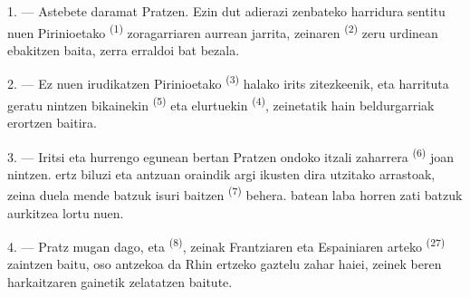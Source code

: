 %

\VUsaut{4.0mm}
\VUsaut{3.0mm}

\VUsaut{3.0mm}

\VUsaut{3.0mm}

1. --- Astebete daramat Pratzen. Ezin dut adierazi zenbateko harridura sentitu
nuen Pirinioetako  \textsuperscript{(1)} zoragarriaren aurrean
jarrita, zeinaren  \textsuperscript{(2)} zeru urdinean ebakitzen
baita, zerra erraldoi bat bezala.

2. --- Ez nuen irudikatzen Pirinioetako 
\textsuperscript{(3)} halako  irits zitezkeenik, eta harrituta
geratu nintzen  bikainekin \textsuperscript{(5)} eta
 elurtuekin \textsuperscript{(4)}, zeinetatik hain
 beldurgarriak erortzen baitira.

\VUsaut{3.0mm}
\VUsaut{3.0mm}

3. --- Iritsi eta hurrengo egunean bertan Pratzen ondoko 
itzali zaharrera \textsuperscript{(6)} joan nintzen.  ertz
biluzi eta antzuan oraindik argi ikusten dira  utzitako arrastoak,
zeina duela mende batzuk isuri baitzen 
\textsuperscript{(7)} behera.  batean laba horren zati batzuk
aurkitzea lortu nuen.

4. --- Pratz mugan dago, eta  \textsuperscript{(8)}, zeinak
Frantziaren eta Espainiaren arteko  \textsuperscript{(27)}
zaintzen baitu, oso antzekoa da Rhin ertzeko gaztelu zahar haiei, zeinek beren harkaitzaren
gainetik  zelatatzen baitute.

